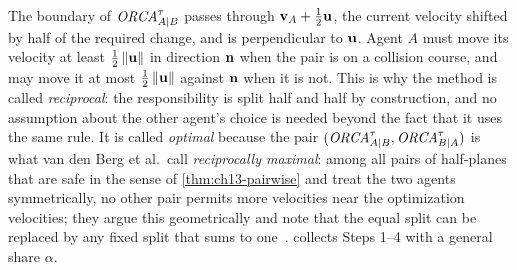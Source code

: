 The boundary of $\mathit{ORCA}^{\tau}_{A|B}$ passes through $\mathbf{v}_A + \tfrac12\mathbf{u}$,
the current velocity shifted by half of the required change, and is
perpendicular to $\mathbf{u}$. Agent $A$ must move its velocity at least
$\tfrac12\left\lVert \mathbf{u} \right\rVert$ in direction $\mathbf{n}$ when the pair is on a
collision course, and may move it at most $\tfrac12\left\lVert \mathbf{u} \right\rVert$ against
$\mathbf{n}$ when it is not. This is why the method is called
\emph{reciprocal}: the responsibility is split half and half by construction,
and no assumption about the other agent's choice is needed beyond the fact
that it uses the same rule. It is called \emph{optimal} because the pair
$(\mathit{ORCA}^{\tau}_{A|B}, \mathit{ORCA}^{\tau}_{B|A})$ is what van den Berg et al.\ call
\emph{reciprocally maximal}: among all pairs
of half-planes that are safe in the sense of \cref{thm:ch13-pairwise} and
treat the two agents symmetrically, no other pair permits more velocities
near the optimization velocities; they argue this geometrically and note that
the equal split can be replaced by any fixed split that sums to
one~\cite{vandenberg2011orca}. 
collects Steps 1--4 with a general share $\alpha$.

